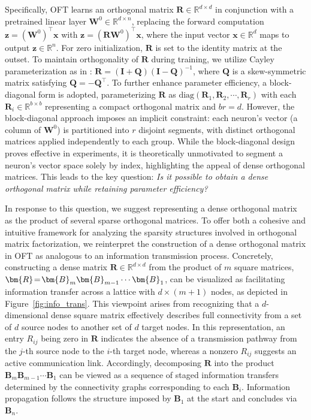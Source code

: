 Specifically, OFT learns an orthogonal matrix $\bm{R}\in\mathbb{R}^{d\times d}$ in conjunction with a pretrained linear layer $\bm{W}^0\in\mathbb{R}^{d\times n}$, replacing the forward computation $\bm{z}=(\bm{W}^0)^\top\bm{x}$ with $\bm{z}=(\bm{R}\bm{W}^0)^\top\bm{x}$, where the input vector $\bm{x}\in\mathbb{R}^{d}$ maps to output $\bm{z}\in\mathbb{R}^{n}$. For zero initialization, $\bm{R}$ is set to the identity matrix at the outset. To maintain orthogonality of $\bm{R}$ during training, we utilize Cayley parameterization as in \cite{qiu2023controlling,liu2021orthogonal}: $\bm{R}=(\bm{I}+\bm{Q})(\bm{I}-\bm{Q})^{-1}$, where $\bm{Q}$ is a skew-symmetric matrix satisfying $\bm{Q}=-\bm{Q}^\top$. To further enhance parameter efficiency, a block-diagonal form is adopted, parameterizing $\bm{R}$ as $\text{diag}(\bm{R}_1,\bm{R}_2,\cdots,\bm{R}_r)$ with each $\bm{R}_i\in\mathbb{R}^{b\times b}$ representing a compact orthogonal matrix and $br=d$. However, the block-diagonal approach imposes an implicit constraint: each neuron's vector (a column of $\bm{W}^0$) is partitioned into $r$ disjoint segments, with distinct orthogonal matrices applied independently to each group. While the block-diagonal design proves effective in experiments, it is theoretically unmotivated to segment a neuron's vector space solely by index, highlighting the appeal of dense orthogonal matrices. This leads to the key question: \emph{Is it possible to obtain a dense orthogonal matrix while retaining parameter efficiency?}

In response to this question, we suggest representing a dense orthogonal matrix as the product of several sparse orthogonal matrices. To offer both a cohesive and intuitive framework for analyzing the sparsity structures involved in orthogonal matrix factorization, we reinterpret the construction of a dense orthogonal matrix in OFT as analogous to an information transmission process. Concretely, constructing a dense matrix $\bm{R}\in\mathbb{R}^{d\times d}$ from the product of $m$ square matrices, $\thickmuskip=2mu \medmuskip=2mu \bm{R}=\bm{B}_m\bm{B}_{m-1}\cdots\bm{B}_1$, can be visualized as facilitating information transfer across a lattice with $d\times (m+1)$ nodes, as depicted in Figure~\ref{fig:info_trans}. This viewpoint arises from recognizing that a $d$-dimensional dense square matrix effectively describes full connectivity from a set of $d$ source nodes to another set of $d$ target nodes. In this representation, an entry $R_{ij}$ being zero in $\bm{R}$ indicates the absence of a transmission pathway from the $j$-th source node to the $i$-th target node, whereas a nonzero $R_{ij}$ suggests an active communication link. Accordingly, decomposing $\bm{R}$ into the product $\bm{B}_m\bm{B}_{m-1}\cdots\bm{B}_1$ can be viewed as a sequence of staged information transfers determined by the connectivity graphs corresponding to each $\bm{B}_i$. Information propagation follows the structure imposed by $\bm{B}_1$ at the start and concludes via $\bm{B}_n$. 

